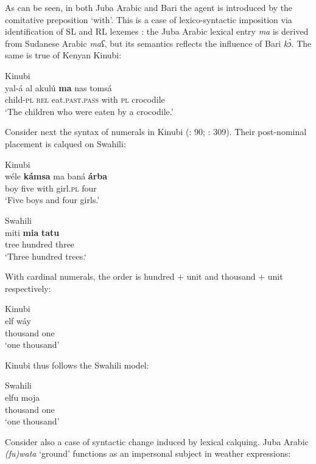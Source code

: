 \documentclass[output=paper]{langsci/langscibook}
\begin{document}
As can be seen, in both Juba Arabic and Bari the agent is introduced by the comitative preposition ‘with’. This is a case of lexico-syntactic imposition via identification of SL and RL lexemes \citep[415]{Manfredi2018}: the Juba Arabic lexical entry \textit{ma} is derived from Sudanese Arabic \textit{maʕ}, but its semantics reflects the influence of Bari \textit{kɔ̀}. The same is true of Kenyan Kinubi:

\ea\label{ex:key:}
{       Kinubi \citep[230]{Luffin2005}}\\
\gll yal-á al akulú \textbf{ma} nas tomsá\\
     child-\textsc{pl} \textsc{rel} eat.\textsc{past.pass} with \textsc{pl} crocodile\\
\glt     `The children who were eaten by a crocodile.'
\z

Consider next the syntax of numerals in Kinubi (\citealt{Wellens2003}: 90; \citealt{Luffin2014}: 309). Their post-nominal placement is calqued on Swahili:

\ea\label{ex:key:}
{Kinubi \citep[309]{Luffin2014}}\\
\gll wéle \textbf{kámsa} ma baná \textbf{árba}\\
     boy five with girl.\textsc{pl} four\\
\glt     `Five boys and four girls.'
\z

\ea\label{ex:key:}
{Swahili \citep[309]{Luffin2014}}\\
\gll miti \textbf{mia} \textbf{tatu}\\
     tree hundred three\\
\glt     `Three hundred trees.`
\z

With cardinal numerals, the order is hundred + unit and thousand + unit respectively:

 

 \ea\label{ex:key:}
{Kinubi \citep[309]{Luffin2014}}\\

\gll   elf wáy\\
       thousand one\\
\glt      `one thousand'
\z

Kinubi thus follows the Swahili model:

\ea
{Swahili \citep[309]{Luffin2014}}\\
\gll            elfu moja \\
                thousand one \\
\glt     `one thousand'
\z

Consider also a case of syntactic change induced by lexical calquing. Juba Arabic \textit{(fu)wata} ‘ground’ functions as an impersonal subject in weather expressions:
\end{document}
